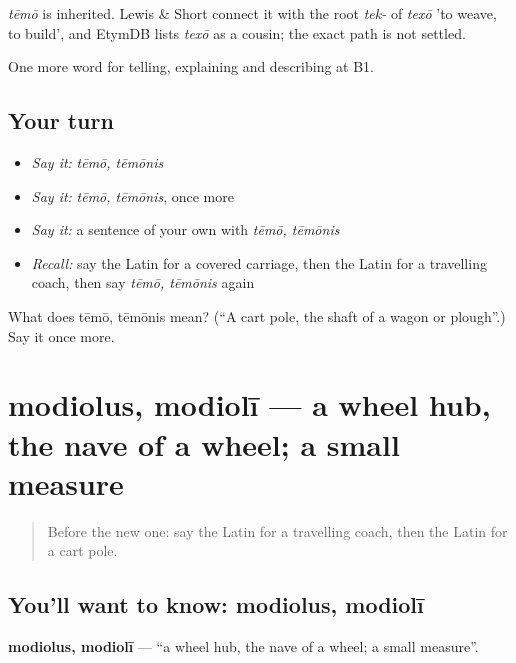 \begin{cousinweb}
\emph{tēmō} is inherited. Lewis \& Short connect it with the root \emph{tek-} of \emph{texō} 'to weave, to build', and EtymDB lists \emph{texō} as a cousin; the exact path is not settled.
\end{cousinweb}

\begin{grammarlens}[title={What you've built}]
One more word for telling, explaining and describing at B1.
\end{grammarlens}

\subsection*{Your turn}
\begin{itemize}
\raggedright
  \item \emph{Say it:} \emph{tēmō, tēmōnis}
  \item \emph{Say it:} \emph{tēmō, tēmōnis}, once more
  \item \emph{Say it:} a sentence of your own with \emph{tēmō, tēmōnis}
  \item \emph{Recall:} say the Latin for a covered carriage, then the Latin for a travelling coach, then say \emph{tēmō, tēmōnis} again
\end{itemize}

\begin{tcolorbox}[breakable,colback=teal!4,colframe=teal!35!black,title={Before you move on}]
What does tēmō, tēmōnis mean? (\textquotedblleft{}A cart pole, the shaft of a wagon or plough\textquotedblright{}.) Say it once more.
\end{tcolorbox}
\section[modiolus, modiolī]{modiolus, modiolī — a wheel hub, the nave of a wheel; a small measure}

\label{lesson:LA-C430-modiolus}



\begin{quote}
Before the new one: say the Latin for a travelling coach, then the Latin for a cart pole.
\end{quote}

\subsection*{You'll want to know: modiolus, modiolī}
\textbf{modiolus, modiolī} — \textquotedblleft{}a wheel hub, the nave of a wheel; a small measure\textquotedblright{}.

